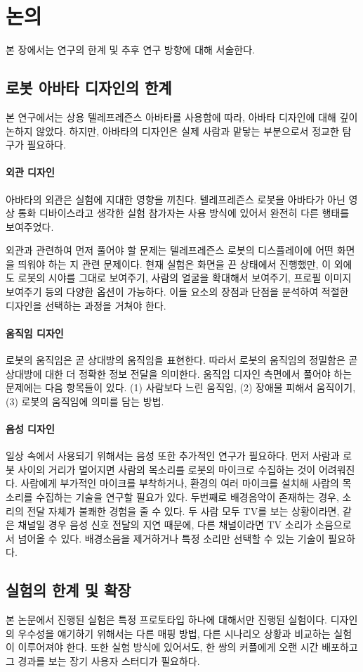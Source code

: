 \chapter{논의}
\label{sec:discussion}

본 장에서는 연구의 한계 및 추후 연구 방향에 대해 서술한다.

\section{로봇 아바타 디자인의 한계}

본 연구에서는 상용 텔레프레즌스 아바타를 사용함에 따라, 아바타 디자인에 대해 깊이 논하지 않았다. 하지만, 아바타의 디자인은 실제 사람과 맡닿는 부분으로서 정교한 탐구가 필요하다.


\subsubsection{외관 디자인}

아바타의 외관은 실험에 지대한 영향을 끼친다. 텔레프레즌스 로봇을 아바타가 아닌 영상 통화 디바이스라고 생각한 실험 참가자는 사용 방식에 있어서 완전히 다른 행태를 보여주었다.

외관과 관련하여 먼저 풀어야 할 문제는 텔레프레즌스 로봇의 디스플레이에 어떤 화면을 띄워야 하는 지 관련 문제이다. 현재 실험은 화면을 끈 상태에서 진행했만, 이 외에도 로봇의 시야를 그대로 보여주기, 사람의 얼굴을 확대해서 보여주기, 프로필 이미지 보여주기 등의 다양한 옵션이 가능하다. 이들 요소의 장점과 단점을 분석하여 적절한 디자인을 선택하는 과정을 거쳐야 한다.

\subsubsection{움직임 디자인}

로봇의 움직임은 곧 상대방의 움직임을 표현한다. 따라서 로봇의 움직임의 정밀함은 곧 상대방에 대한 더 정확한 정보 전달을 의미한다. 움직임 디자인 측면에서 풀어야 하는 문제에는 다음 항목들이 있다. (1) 사람보다 느린 움직임, (2) 장애물 피해서 움직이기, (3) 로봇의 움직임에 의미를 담는 방법.


\subsubsection{음성 디자인}

일상 속에서 사용되기 위해서는 음성 또한 추가적인 연구가 필요하다. 먼저 사람과 로봇 사이의 거리가 멀어지면 사람의 목소리를 로봇의 마이크로 수집하는 것이 어려워진다. 사람에게 부가적인 마이크를 부착하거나, 환경의 여러 마이크를 설치해 사람의 목소리를 수집하는 기술을 연구할 필요가 있다. 두번째로 배경음악이 존재하는 경우, 소리의 전달 자체가 불쾌한 경험을 줄 수 있다. 두 사람 모두 TV를 보는 상황이라면, 같은 채널일 경우 음성 신호 전달의 지연 때문에, 다른 채널이라면 TV 소리가 소음으로서 넘어올 수 있다. 배경소음을 제거하거나 특정 소리만 선택할 수 있는 기술\cite{flanagan1993spatially}이 필요하다.  



\section{실험의 한계 및 확장}

본 논문에서 진행된 실험은 특정 프로토타입 하나에 대해서만 진행된 실험이다. 디자인의 우수성을 얘기하기 위해서는 다른 매핑 방법, 다른 시나리오 상황과 비교하는 실험이 이루어져야 한다. 또한 실험 방식에 있어서도, 한 쌍의 커플에게 오랜 시간 배포하고 그 경과를 보는 장기 사용자 스터디가 필요하다.


